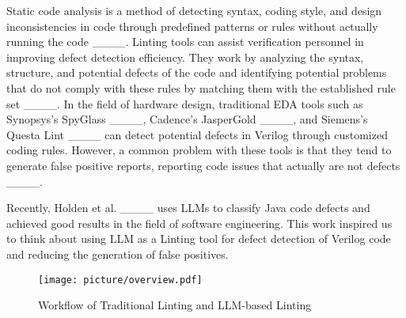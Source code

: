 Static code analysis is a method of detecting syntax, coding style, and design inconsistencies in code through predefined patterns or rules without actually running the code ____. Linting tools can assist verification personnel in improving defect detection efficiency. They work by analyzing the syntax, structure, and potential defects of the code and identifying potential problems that do not comply with these rules by matching them with the established rule set ____. In the field of hardware design, traditional EDA tools such as Synopsys's SpyGlass ____, Cadence's JasperGold ____, and Siemens's Questa Lint ____ can detect potential defects in Verilog through customized coding rules. However, a common problem with these tools is that they tend to generate false positive reports, reporting code issues that actually are not defects ____.  

Recently, Holden et al. ____ uses LLMs to classify Java code defects and achieved good results in the field of software engineering. This work inspired us to think about using LLM as a Linting tool for defect detection of Verilog code and reducing the generation of false positives.


\begin{figure}[t]
	\centering
	\texttt{[image: picture/overview.pdf]} %
	\caption{Workflow of Traditional Linting and LLM-based Linting}
	\label{pic1}
	\vspace{-2mm}
\end{figure}